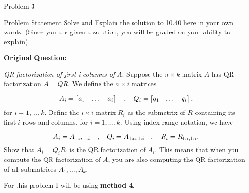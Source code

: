 \begin{problem}{Problem 3}
    \begin{statement}{Problem Statement}
        Solve and Explain the solution to 10.40 here in your own words. (Since you are given a solution, you will be graded on your ability to explain). \vspace*{1em}

        \noindent \textbf{Original Question:} \vspace*{1em}

        \textit{QR factorization of first i columns of A}. Suppose the $n \times k$ matrix $A$ has QR factorization $A = QR$. We define the $n \times i$ matrices

        \setcounter{equation}{0}
        \begin{equation*}
            A_{i} = 
            \begin{bmatrix}
                a_{1} & \dots & a_{i}
            \end{bmatrix}
            \hspace*{10pt} , \hspace*{10pt}
            Q_{i} = 
            \begin{bmatrix}
                q_{1} & \dots & q_{i}
            \end{bmatrix},
        \end{equation*}
        for $i = 1,\dots,k$. Define the $i \times i$ matrix $R_{i}$ as the submatrix of $R$ containing its first $i$ rows and columns, for $i = 1,\dots,k$. Using index range notation, we have

        \begin{equation*}
            A_{i} = A_{1:n,1:i}
            \hspace*{10pt} , \hspace*{10pt}
            Q_{i} = A_{1:n,1:i}
            \hspace*{10pt} , \hspace*{10pt}
            R_{i} = R_{1:i,1:i}.
        \end{equation*}
        Show that $A_{i} = Q_{i}R_{i}$ is the QR factorization of $A_{i}$. This means that when you compute the QR factorization of $A$, you are also computing the QR factorization of all submatrices 
        $A_{1},\dots,A_{k}$.
    \end{statement}

    \begin{Highlight}[Solution]
        \noindent For this problem I will be using \textbf{method 4}. \vspace*{1em}


\end{Highlight}
\end{problem}
